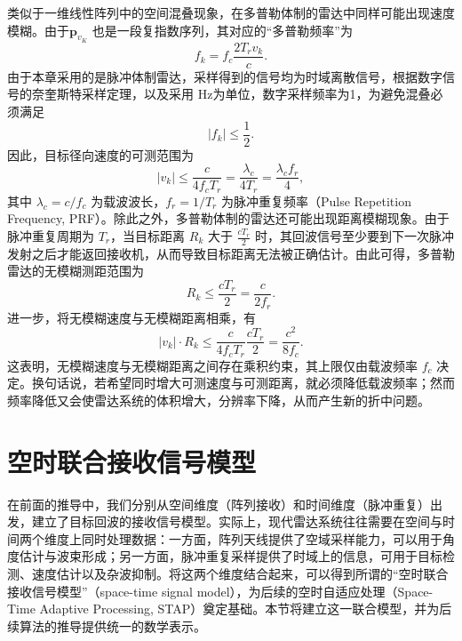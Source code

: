 类似于一维线性阵列中的空间混叠现象，在多普勒体制的雷达中同样可能出现速度模糊。由于\(\bm{p}_{v_K}\) 也是一段复指数序列，其对应的``多普勒频率''为
\[
    f_k = f_c \frac{2 T_r v_k}{c}.
\]
由于本章采用的是脉冲体制雷达，采样得到的信号均为时域离散信号，根据数字信号的奈奎斯特采样定理，以及采用 Hz为单位，数字采样频率为1，为避免混叠必须满足
\[
    |f_k| \leq \frac{1}{2}.
\]
因此，目标径向速度的可测范围为
\[
    |v_k| \leq \frac{c}{4 f_c T_r}
    = \frac{\lambda_c}{4 T_r}
    = \frac{\lambda_c f_r}{4},
\]
其中 \(\lambda_c = c/f_c\) 为载波波长，\(f_r = 1/T_r\) 为脉冲重复频率（Pulse Repetition Frequency, PRF）。除此之外，多普勒体制的雷达还可能出现距离模糊现象。由于脉冲重复周期为 \(T_r\)，当目标距离 \(R_k\) 大于 \(\tfrac{c T_r}{2}\) 时，其回波信号至少要到下一次脉冲发射之后才能返回接收机，从而导致目标距离无法被正确估计。由此可得，多普勒雷达的无模糊测距范围为
\[
    R_k \leq \frac{c T_r}{2} = \frac{c}{2 f_r}.
\]
进一步，将无模糊速度与无模糊距离相乘，有
\[
    |v_k| \cdot R_k \leq
    \frac{c}{4 f_c T_r} \frac{c T_r}{2}
    = \frac{c^2}{8 f_c}.
\]
这表明，无模糊速度与无模糊距离之间存在乘积约束，其上限仅由载波频率 \(f_c\) 决定。换句话说，若希望同时增大可测速度与可测距离，就必须降低载波频率；然而频率降低又会使雷达系统的体积增大，分辨率下降，从而产生新的折中问题。


\section{空时联合接收信号模型}

在前面的推导中，我们分别从空间维度（阵列接收）和时间维度（脉冲重复）出发，建立了目标回波的接收信号模型。实际上，现代雷达系统往往需要在空间与时间两个维度上同时处理数据：一方面，阵列天线提供了空域采样能力，可以用于角度估计与波束形成；另一方面，脉冲重复采样提供了时域上的信息，可用于目标检测、速度估计以及杂波抑制。将这两个维度结合起来，可以得到所谓的``空时联合接收信号模型''（space-time signal model），为后续的空时自适应处理（Space-Time Adaptive Processing, STAP）奠定基础。本节将建立这一联合模型，并为后续算法的推导提供统一的数学表示。


